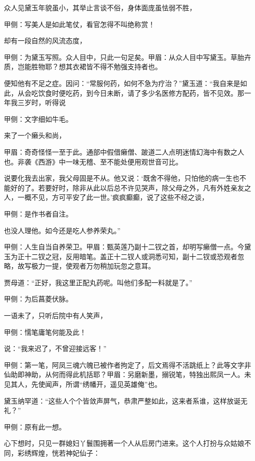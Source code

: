 \begin{parag}
    众人见黛玉年貌虽小，其举止言谈不俗，身体面庞虽怯弱不胜，\begin{note}甲侧：写美人是如此笔仗，看官怎得不叫绝称赏！\end{note}却有一段自然的风流态度，\begin{note}甲侧：为黛玉写照。众人目中，只此一句足矣。甲眉：从众人目中写黛玉。草胎卉质，岂能胜物耶？想其衣裙皆不得不勉强支持者也。\end{note}便知他有不足之症。因问：“常服何药，如何不急为疗治？”黛玉道：“我自来是如此，从会吃饮食时便吃药，到今日未断，请了多少名医修方配药，皆不见效。那一年我三岁时，听得说\begin{note}甲侧：文字细如牛毛。\end{note}来了一个癞头和尚，\begin{note}甲眉：奇奇怪怪一至于此。通部中假借癞僧、跛道二人点明迷情幻海中有数之人也。非袭《西游》中一味无稽、至不能处便用观世音可比。\end{note}说要化我去出家，我父母固是不从。他又说：‘既舍不得他，只怕他的病一生也不能好的了。若要好时，除非从此以后总不许见哭声，除父母之外，凡有外姓亲友之人，一概不见，方可平安了此一世。’疯疯癫癫，说了这些不经之谈，\begin{note}甲侧：是作书者自注。\end{note}也没人理他。如今还是吃人参养荣丸。”\begin{note}甲侧：人生自当自养荣卫。甲眉：甄英莲乃副十二钗之首，却明写癞僧一点。今黛玉为正十二钗之冠，反用暗笔。盖正十二钗人或洞悉可知，副十二钗或恐观者忽略，故写极力一提，使观者万勿稍加玩忽之意耳。\end{note}贾母道：“正好，我这里正配丸药呢。叫他们多配一料就是了。”\begin{note}甲侧：为后菖菱伏脉。\end{note}
\end{parag}


\begin{parag}
    一语未了，只听后院中有人笑声，\begin{note}甲侧：懦笔庸笔何能及此！\end{note}说：“我来迟了，不曾迎接远客！”\begin{note}甲侧：第一笔，阿凤三魂六魄已被作者拘定了，后文焉得不活跳纸上？此等文字非仙助即神助，从何而得此机括耶？甲眉：另磨新墨，搦锐笔，特独出熙凤一人。未见其人，先使闻声，所谓“绣幡开，遥见英雄俺”也。\end{note}黛玉纳罕道：“这些人个个皆敛声屏气，恭肃严整如此，这来者系谁，这样放诞无礼？”\begin{note}甲侧：原有此一想。\end{note}心下想时，只见一群媳妇丫鬟围拥著一个人从后房门进来。这个人打扮与众姑娘不同，彩绣辉煌，恍若神妃仙子：
\end{parag}

